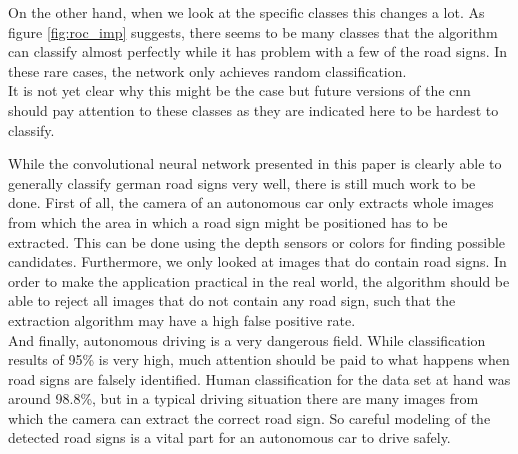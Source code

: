 \documentclass[11pt,a4paper]{article}
\begin{document}
On the other hand, when we look at the specific classes this changes a lot. As figure \ref{fig:roc_imp} suggests, there seems to be many classes that the algorithm can classify almost perfectly while it has problem with a few of the road signs. In these rare cases, the network only achieves random classification.\\
It is not yet clear why this might be the case but future versions of the cnn should pay attention to these classes as they are indicated here to be hardest to classify.

While the convolutional neural network presented in this paper is clearly able to generally classify german road signs very well, there is still much work to be done. First of all, the camera of an autonomous car only extracts whole images from which the area in which a road sign might be positioned has to be extracted. This can be done using the depth sensors or colors for finding possible candidates. Furthermore, we only looked at images that do contain road signs. In order to make the application practical in the real world, the algorithm should be able to reject all images that do not contain any road sign, such that the extraction algorithm may have a high false positive rate.\\
And finally, autonomous driving is a very dangerous field. While classification results of 95\% is very high, much attention should be paid to what happens when road signs are falsely identified. Human classification for the data set at hand was around 98.8\%, but in a typical driving situation there are many images from which the camera can extract the correct road sign. So careful modeling of the detected road signs is a vital part for an autonomous car to drive safely.
\newpage


\end{document}
